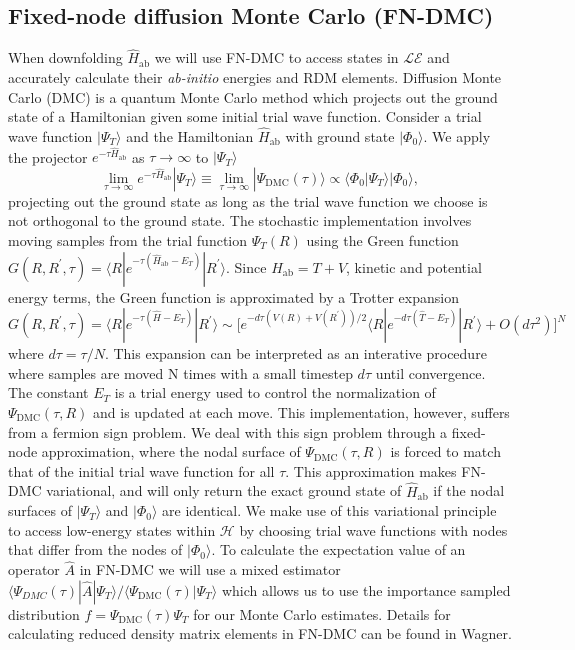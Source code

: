 \documentclass{article}
\begin{document}
\subsection{Fixed-node diffusion Monte Carlo (FN-DMC)}
When downfolding $\hat{H}_\text{ab}$ we will use FN-DMC to access states in $\mathcal{LE}$ and accurately calculate their \textit{ab-initio} energies and RDM elements.
Diffusion Monte Carlo (DMC) is a quantum Monte Carlo method which projects out the ground state of a Hamiltonian given some initial trial wave function.
Consider a trial wave function $|\Psi_T\rangle$ and the Hamiltonian $\hat{H}_\text{ab}$ with ground state $|\Phi_0\rangle$. We apply the projector $e^{-\tau \hat{H}_\text{ab}}$ as $\tau \rightarrow \infty$ to $|\Psi_T \rangle$
\begin{equation}
\lim_{\tau \rightarrow \infty} e^{-\tau \hat{H}_\text{ab}} |\Psi_T\rangle 
\equiv \lim_{\tau \rightarrow \infty} |\Psi_\text{DMC}(\tau)\rangle \propto \langle \Phi_0|\Psi_T\rangle |\Phi_0\rangle,
\end{equation}
projecting out the ground state as long as the trial wave function we choose is not orthogonal to the ground state. 
The stochastic implementation involves moving samples from the trial function $\Psi_T(R)$ using the Green function $G(R, R^\prime, \tau) = \langle R | e^{-\tau(\hat{H}_\text{ab} - E_T)} | R^\prime \rangle$. Since $H_\text{ab} = T + V$, kinetic and potential energy terms, the Green function is approximated by a Trotter expansion $G(R, R^\prime, \tau) = \langle R | e^{-\tau(\hat{H} - E_T)} | R^\prime \rangle \sim \Big[e^{-d\tau(V(R) + V(R^\prime))/2} \langle R| e^{-d\tau(\hat{T} - E_T)}|R^\prime \rangle + O(d\tau^2) \Big]^N $ where $d\tau = \tau/N$.
This expansion can be interpreted as an interative procedure where samples are moved N times with a small timestep $d\tau$ until convergence.
The constant $E_T$ is a trial energy used to control the normalization of $\Psi_\text{DMC}(\tau, R)$ and is updated at each move.
This implementation, however, suffers from a fermion sign problem. 
We deal with this sign problem through a fixed-node approximation, where the nodal surface of $\Psi_\text{DMC}(\tau, R)$ is forced to match that of the initial trial wave function for all $\tau$.
This approximation makes FN-DMC variational, and will only return the exact ground state of $\hat{H}_\text{ab}$ if the nodal surfaces of $|\Psi_T\rangle$ and $|\Phi_0\rangle$ are identical.
We make use of this variational principle to access low-energy states within $\mathcal{H}$ by choosing trial wave functions with nodes that differ from the nodes of $|\Phi_0 \rangle$.
To calculate the expectation value of an operator $\hat{A}$ in FN-DMC we will use a mixed estimator $\langle \Psi_{DMC}(\tau) |\hat{A} | \Psi_T \rangle/\langle \Psi_\text{DMC}(\tau) | \Psi_T \rangle$ which allows us to use the importance sampled distribution $f = \Psi_\text{DMC}(\tau)\Psi_T$ for our Monte Carlo estimates.
Details for calculating reduced density matrix elements in FN-DMC can be found in Wagner.
\end{document}
